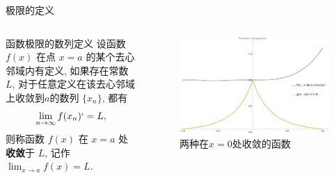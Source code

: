\documentclass[
10pt,  
aspectratio=43,  
]{beamer}
\begin{document}
\begin{frame}[c]{极限的定义}
\begin{columns}[onlytextwidth]

\begin{block}{函数极限的数列定义}
	设函数 $f(x)$ 在点 $x=a$ 的某个去心邻域内有定义,  如果存在常数 $L$,  对于任意定义在该去心邻域上收敛到$a$的数列 $\{x_n\}$,  都有 
 \begin{equation*}
\lim_{n\to\infty} f(x_n)` = L,  
 \end{equation*}
 则称函数 $f(x)$ 在 $x=a$ 处\textbf{收敛}于 $L$,  记作 $\lim_{x \to a} f(x) = L$.
\end{block}


\begin{figure}
    \centering
    \includegraphics[width=0.9\linewidth]{convergent function1.png}
    \caption{两种在$x=0$处收敛的函数}

\end{figure}
\end{columns}
\end{frame}	
\end{document}
